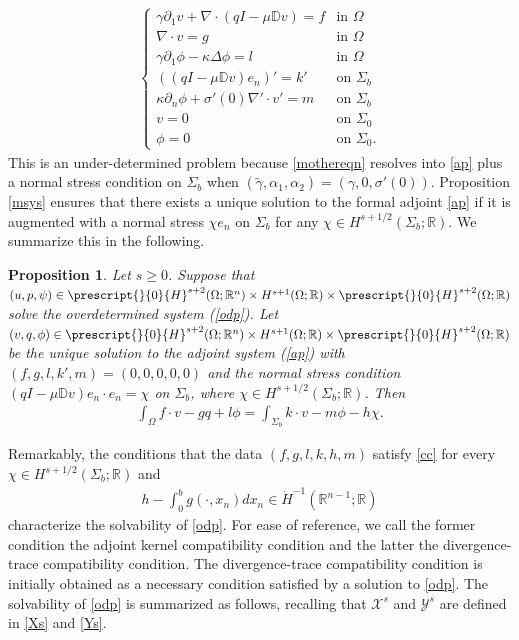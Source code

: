 \documentclass[11pt,letterpaper,reqno]{amsart}
\newtheorem{proposition}[theorem]{Proposition}
\numberwithin{equation}{section}
\begin{document}
\begin{align} \label{ap}
    \begin{cases}
        \gamma \partial_{1}v + \nabla \cdot (qI-\mu\mathbb{D}v) = f &\mbox{in \(\Omega\)} \\
        \nabla \cdot v = g &\mbox{in \(\Omega\)} \\
        \gamma \partial_{1}\phi -\kappa\Delta\phi = l &\mbox{in \(\Omega\)} \\
        ((qI-\mu\mathbb{D}v)e_{n})' =k' &\mbox{on \(\Sigma_{b}\)} \\
        \kappa\partial_{n}\phi +\sigma'(0)\nabla' \cdot v'= m &\mbox{on \(\Sigma_{b}\)} \\
        v = 0 &\mbox{on \(\Sigma_{0}\)} \\
        \phi = 0 &\mbox{on \(\Sigma_{0}\)}.
    \end{cases}
\end{align}
This is an under-determined problem because \eqref{mothereqn} resolves into \eqref{ap} plus a normal stress condition on \(\Sigma_{b}\) when \((\widetilde{\gamma},\alpha_{1},\alpha_{2})=(\gamma,0,\sigma'(0))\). Proposition \ref{msys} ensures that there exists a unique solution to the formal adjoint \eqref{ap} if it is augmented with a normal stress \(\chi e_{n}\) on \(\Sigma_{b}\) for any \(\chi \in H^{s+1/2}(\Sigma_{b};\mathbb{R})\). We summarize this in the following.

\begin{proposition} \label{compcond}
    Let \(s \geq 0\). Suppose that \((u,p,\psi) \in \prescript{}{0}{H}^{s+2}(\Omega;\mathbb{R}^{n}) \times H^{s+1}(\Omega;\mathbb{R}) \times \prescript{}{0}{H}^{s+2}(\Omega;\mathbb{R})\) solve the overdetermined system (\ref{odp}). Let \((v,q,\phi) \in \prescript{}{0}{H}^{s+2}(\Omega;\mathbb{R}^{n}) \times H^{s+1}(\Omega;\mathbb{R}) \times \prescript{}{0}{H}^{s+2}(\Omega;\mathbb{R})\) be the unique solution to the adjoint system (\ref{ap}) with \((f,g,l,k',m)=(0,0,0,0,0)\) and the normal stress condition \((qI-\mu\mathbb{D}v)e_{n} \cdot e_{n}=\chi\) on \(\Sigma_{b}\), where \(\chi \in H^{s+1/2}(\Sigma_{b};\mathbb{R})\). Then
    \begin{align} \label{cc}
        \int_{\Omega}f \cdot v - gq+l\phi = \int_{\Sigma_{b}}k \cdot v-m\phi-h\chi.
    \end{align}
\end{proposition}
Remarkably, the conditions that the data \((f,g,l,k,h,m)\) satisfy \eqref{cc} for every \(\chi \in H^{s+1/2}(\Sigma_{b};\mathbb{R})\) and
\begin{align}
    h-\int_{0}^{b}g(\cdot,x_{n})dx_{n}\in \dot{H}^{-1}(\mathbb{R}^{n-1};\mathbb{R})
\end{align}
characterize the solvability of \eqref{odp}. For ease of reference, we call the former condition the adjoint kernel compatibility condition and the latter the divergence-trace compatibility condition. The divergence-trace compatibility condition is initially obtained as a necessary condition satisfied by a solution to \eqref{odp}. The solvability of \eqref{odp} is summarized as follows, recalling that \(\mathcal{X}^{s}\) and \(\mathcal{Y}^{s}\) are defined in \eqref{Xs} and \eqref{Ys}.
\end{document}
